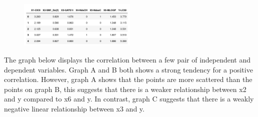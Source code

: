 \documentclass{ueacmpstyle}
\begin{document}
    \begin{figure}[!htb]
    	\centering
    	\includegraphics[width=0.5\textwidth]{qsar_data.png}
    	\label{fig1}	
    \end{figure}

	The graph below displays the correlation between a few pair of independent and dependent variables. Graph A and B both shows a strong tendency for a positive correlation. However, graph A shows that the points are more scattered than the points on graph B, this suggests that there is a weaker relationship between x2 and y compared to x6 and y. In contrast, graph C suggests that there is a weakly negative linear relationship between x3 and y.
    
\end{document}
